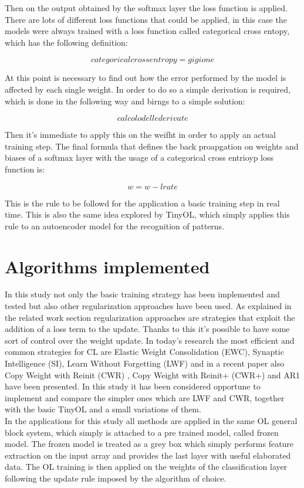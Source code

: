 \documentclass[12pt]{report}
\begin{document}
Then on the output obtained by the softmax layer the loss function is applied. There are lots of different loss functions that could be applied, in this case the models were always trained with a loss function called categorical cross entopy, which has the following definition:

\begin{equation}
categorical cross entropy = gigione
\end{equation}

At this point is necessary to find out how the error performed by the model is affected by each single weight. In order to do so a simple derivation is required, which is done in the following way and birngs to a simple solution:

\begin{equation}
calcolo delle derivate
\end{equation}

Then it's immediate to apply this on the weifht in order to apply an actual training step. The final formula that defines the back proapgation on weights and biases of a softmax layer with the usage of a categorical cross entrioyp loss function is:

\begin{equation}
w = w- l rate
\end{equation}

This is the rule to be followd for the application a basic training step in real time. This is also the same idea explored by TinyOL, which simply applies this rule to an autoencoder model for the recognition of patterns. \\


\section{Algorithms implemented}
In this study not only the basic training strategy has been implemented and tested but also other regularization approaches have been used. As explained in the related work section regularization approaches are strategies that exploit the addition of a loss term to the update. Thanks to this it's possible to have some sort of control over the weight update. In today's research the most efficient and common strategies for CL are Elastic Weight Consolidation (EWC), Synaptic Intelligence (SI), Learn Without Forgetting (LWF) \cite{li2017learning} and in a recent paper also Copy Weight with Reinit (CWR) \cite{lomonaco2017core50}, Copy Weight with Reinit+ (CWR+) \cite{maltoni2019continuous} and AR1 \cite{maltoni2019continuous} have been presented. In this study it has been considered opportune to implement and compare the simpler ones which are LWF and CWR, together with the basic TinyOL and a small variations of them. \\
In the applications for this study all methods are applied in the same OL general block system, which simply is attached to a pre trained model, called frozen model. The frozen model is treated as a grey box which simply performs feature extraction on the input array and provides the last layer with useful elaborated data. The OL training is then applied on the weights of the classification layer following the update rule imposed by the algorithm of choice.
\end{document}
